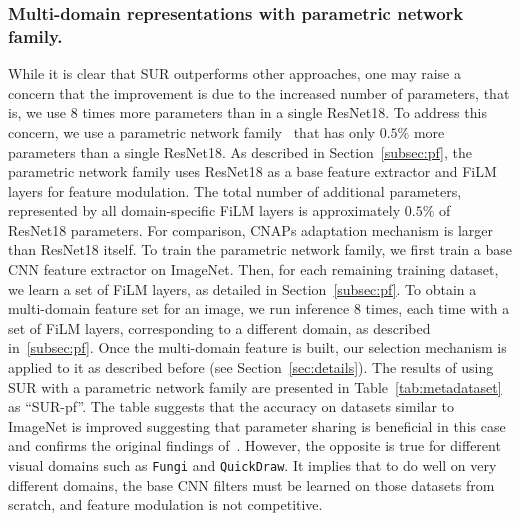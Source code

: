 \documentclass[runningheads]{llncs}
\begin{document}
\subsubsection{Multi-domain representations with parametric network family.}
While it is clear that SUR outperforms other approaches, one may raise a
concern that the improvement is due to the increased number of parameters, that is,
we use 8 times more parameters than in a single ResNet18.
To address this concern, we use a parametric network
family~\cite{rebuffi2018efficient} that has only $0.5\%$ more parameters than a
single ResNet18. As described in Section~\ref{subsec:pf}, the parametric network
family uses ResNet18 as a base feature extractor and FiLM~\cite{perez2018film}
layers for feature modulation. The total number of additional parameters,
represented by all domain-specific FiLM layers is approximately $0.5\%$ of
ResNet18 parameters. For comparison, CNAPs adaptation mechanism is larger than
ResNet18 itself. To train the parametric network family, we first train a base
CNN feature extractor on ImageNet. Then, for each remaining training dataset, we
learn a set of FiLM layers, as detailed in Section~\ref{subsec:pf}. To obtain a
multi-domain feature set for an image, we run inference 8 times, each time with a
set of FiLM layers, corresponding to a different domain, as described
in~\ref{subsec:pf}. Once the multi-domain feature is built, our selection mechanism
is applied to it as described before (see Section~\ref{sec:details}). The
results of using SUR with a parametric network family are presented in
Table~\ref{tab:metadataset} as ``SUR-pf''. The table suggests that the accuracy
on datasets similar to ImageNet is improved suggesting that parameter
sharing is beneficial in this case and confirms the original findings
of~\cite{rebuffi2018efficient}. However, the opposite is true for different
visual domains such as \texttt{Fungi} and \texttt{QuickDraw}. It implies that to
do well on very different domains, the base CNN filters must be
learned on those datasets from scratch, and feature modulation is not
competitive.
\end{document}
